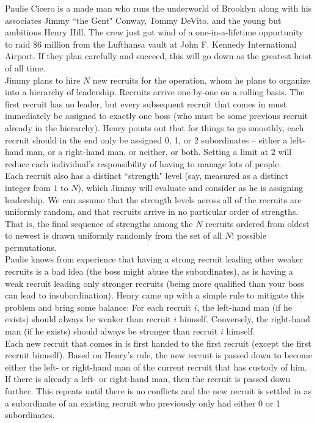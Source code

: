 
\noindent Paulie Cicero is a made man who runs the underworld of Brooklyn along with his associates Jimmy ``the Gent" Conway, Tommy DeVito, and the young but ambitious Henry Hill. The crew just got wind of a one-in-a-lifetime opportunity to raid \$6 million from the Lufthansa vault at John F. Kennedy International Airport. If they plan carefully and succeed, this will go down as the greatest heist of all time.\\

Jimmy plans to hire $N$ new recruits for the operation, whom he plans to organize into a hierarchy of leadership. Recruits arrive one-by-one on a rolling basis. The first recruit has no leader, but every subsequent recruit that comes in must immediately be assigned to exactly one boss (who must be some previous recruit already in the hierarchy). Henry points out that for things to go smoothly, each recruit should in the end only be assigned 0, 1, or 2 subordinates -- either a left-hand man, or a right-hand man, or neither, or both. Setting a limit at 2 will reduce each individual's responsibility of having to manage lots of people.\\

Each recruit also has a distinct ``strength" level (say, measured as a distinct integer from $1$ to $N$), which Jimmy will evaluate and consider as he is assigning leadership. We can assume that the strength levels across all of the recruits are uniformly random, and that recruits arrive in no particular order of strengths. That is, the final sequence of strengths among the $N$ recruits ordered from oldest to newest is drawn uniformly randomly from the set of all $N!$ possible permutations.\\

Paulie knows from experience that having a strong recruit leading other weaker recruits is a bad idea (the boss might abuse the subordinates), as is having a weak recruit leading only stronger recruits (being more qualified than your boss can lead to insubordination). Henry came up with a simple rule to mitigate this problem and bring some balance: For each recruit $i$, the left-hand man (if he exists) should always be weaker than recruit $i$ himself. Conversely, the right-hand man (if he exists) should always be stronger than recruit $i$ himself.\\

Each new recruit that comes in is first handed to the first recruit (except the first recruit himself). Based on Henry's rule, the new recruit is passed down to become either the left- or right-hand man of the current recruit that has custody of him. If there is already a left- or right-hand man, then the recruit is passed down further. This repeats until there is no conflicts and the new recruit is settled in as a subordinate of an existing recruit who previously only had either 0 or 1 subordinates.\\

